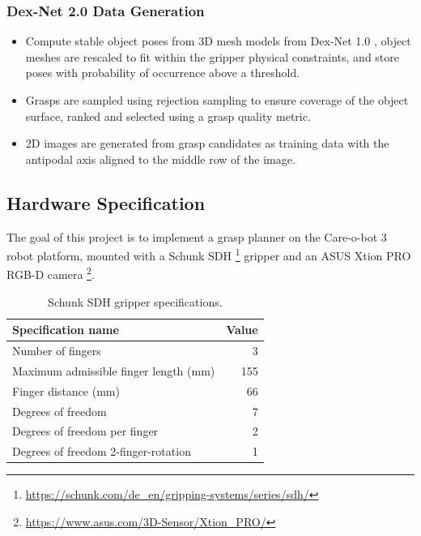\documentclass[12pt]{article}
\begin{document}
    \subsubsection{Dex-Net 2.0 Data Generation} \label{dexnet-generation}
    \begin{itemize}
        \item Compute stable object poses from 3D mesh models from Dex-Net 1.0 \cite{mahler2016}, object meshes are rescaled to fit within the gripper physical constraints, and store poses with probability of occurrence above a threshold.
        \item Grasps are sampled using rejection sampling to ensure coverage of the object surface, ranked and selected using a grasp quality metric.
        \item 2D images are generated from grasp candidates as training data with the antipodal axis aligned to the middle row of the image.
    \end{itemize}

    \subsection{Hardware Specification} \label{hw-spec}
    The goal of this project is to implement a grasp planner on the Care-o-bot 3 robot platform, mounted with a Schunk SDH \footnote{\url{https://schunk.com/de_en/gripping-systems/series/sdh/}} gripper and an ASUS Xtion PRO RGB-D camera \footnote{\url{https://www.asus.com/3D-Sensor/Xtion_PRO/}}.

    \begin{table}[H]
        \centering
        \begin{tabular}{lr}
            \toprule
            Specification name & Value \\ \midrule
            Number of fingers & 3 \\
            Maximum admissible finger length (mm) & 155 \\
            Finger distance (mm) & 66 \\
            Degrees of freedom & 7 \\
            Degrees of freedom per finger & 2 \\
            Degrees of freedom 2-finger-rotation & 1\\
            \bottomrule
        \end{tabular}
        \caption{Schunk SDH gripper specifications.}
    \end{table}
\end{document}
